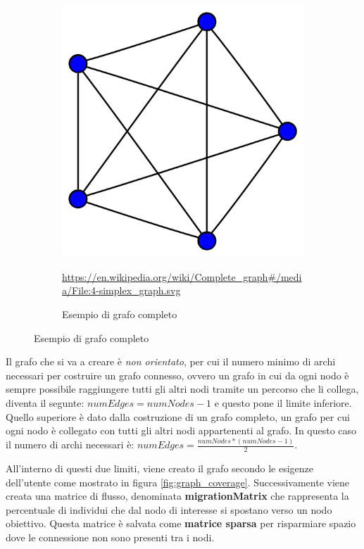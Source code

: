 \begin{figure}[!hb]
\begin{subfigure}[b]{0.45\textwidth}
		\includegraphics[width=\textwidth]{img/4-simplex_graph.svg.png}
		\caption{Esempio di grafo completo}
		\url{https://en.wikipedia.org/wiki/Complete_graph#/media/File:4-simplex_graph.svg}
		\label{fig:complete_graph_example}
	\end{subfigure}
\end{figure}

Il grafo che si va a creare è \emph{non orientato}, per cui il numero minimo di archi necessari 
per costruire un grafo connesso, ovvero un grafo in cui da ogni nodo è sempre possibile raggiungere
tutti gli altri nodi tramite un percorso che li collega, diventa il segunte: $numEdges = numNodes-1$
e questo pone il limite inferiore. Quello superiore è dato dalla costruzione di un grafo completo, 
un grafo per cui ogni nodo è collegato con tutti gli altri nodi appartenenti al grafo. In questo 
caso il numero di archi necessari è: $numEdges = \frac{numNodes*(numNodes-1)}{2}$.

All'interno di questi due limiti, viene creato il grafo secondo le esigenze dell'utente come mostrato 
in figura \ref{fig:graph_coverage}. Successivamente viene creata una matrice di flusso, denominata 
\textbf{migrationMatrix} che rappresenta la percentuale di individui che dal nodo di interesse 
si spostano verso un nodo obiettivo. Questa matrice è salvata come \textbf{matrice sparsa} per 
risparmiare spazio dove le connessione non sono presenti tra i nodi. 

